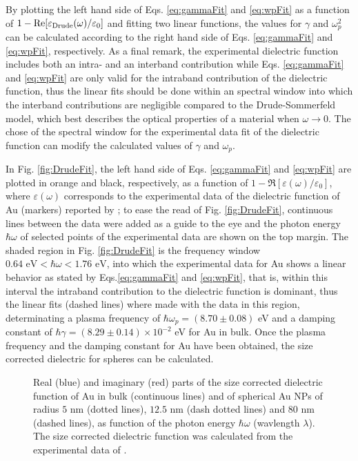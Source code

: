 %
%
By plotting the left hand side of Eqs. \eqref{eq:gammaFit} and \eqref{eq:wpFit} as a function of  $1-\Re[\varepsilon_\text{\scriptsize Drude}(\omega)/\varepsilon_0]$ and fitting two linear functions, the values for $\gamma$ and $\omega_p^2$ can be calculated according to the right hand side of Eqs. \eqref{eq:gammaFit} and \eqref{eq:wpFit}, respectively. As a final remark, the experimental dielectric function includes both an intra- and an interband contribution  while  Eqs. \eqref{eq:gammaFit} and \eqref{eq:wpFit} are only valid for the intraband contribution of the dielectric function, thus the linear fits should be done within an spectral window into which the interband contributions are negligible compared to the Drude-Sommerfeld model, which best describes the optical properties of a material  when $\omega\to 0$. The  chose of the spectral window for the experimental data fit of the dielectric function can modify the calculated values of $\gamma$ and $\omega_p$.
%


 In Fig. \ref{fig:DrudeFit}, the left hand side of Eqs. \eqref{eq:gammaFit}  and \eqref{eq:wpFit} are plotted in orange and black, respectively, as a function of $1-\Re[\varepsilon(\omega)/ \varepsilon_0]$, where $\varepsilon(\omega)$  corresponds to the experimental data of the dielectric function of Au (markers) reported by \citeauthor{johnson_optical_1972} \cite{johnson_optical_1972}; to ease the read of Fig. \ref{fig:DrudeFit}, continuous lines between the data were added as a guide to the eye and the photon energy $\hbar\omega$ of selected points of the experimental data are shown on the top margin. The shaded region in Fig. \ref{fig:DrudeFit} is the frequency window $0.64\text{ eV} < \hbar\omega < 1.76 \text{ eV}$, into which the experimental data for Au shows a linear behavior as stated by Eqs.\eqref{eq:gammaFit}  and \eqref{eq:wpFit}, that is, within this interval  the intraband contribution to the dielectric function is dominant, thus the linear fits (dashed lines) where made with the data in this region, determinating a plasma frequency of $\hbar\omega_p =(8.70\pm0.08)$ eV and a damping constant of $\hbar\gamma = (8.29 \pm 0.14)\times 10^{-2}$ eV for Au in bulk. Once the plasma frequency and the damping constant for Au have been obtained, the size corrected dielectric for spheres can be calculated.

	\begin{figure}[b!]
	\def\svgwidth{.85\textwidth} \centering \small
	\caption[Au size corrected dielectric function]{ Real (blue) and imaginary (red) parts of the size corrected dielectric function of Au in bulk (continuous lines) and  of spherical Au NPs of radius $5$ nm (dotted lines), $12.5$ nm (dash dotted lines) and $80$ nm (dashed lines), as function of the photon energy $\hbar\omega$ (wavlength $\lambda$). The size corrected dielectric function was calculated from the experimental data of \citeauthor{johnson_optical_1972} \cite{johnson_optical_1972}. }
	\label{fig:EpsSize}
	\end{figure}


